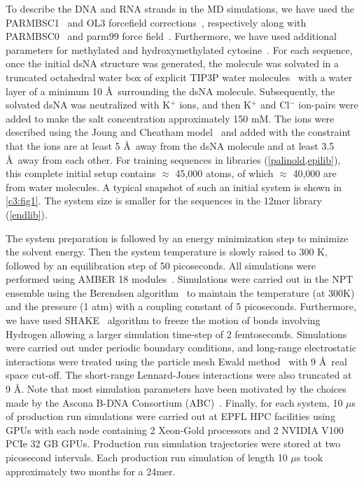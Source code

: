 To describe the DNA and RNA strands in the MD simulations, we have used the PARMBSC1~\cite{parmbsc1} and OL3 forcefield corrections~\cite{zgarbova2011refinement}, respectively along with PARMBSC0~\cite{perez2007refinement} and parm99 force field~\cite{cheatham1999modified}.
Furthermore, we have used additional parameters for methylated and hydroxymethylated cytosine~\cite{battistini2021impact,perez2012impact}.
For each sequence, once the initial dsNA structure was generated, the molecule was solvated in a truncated octahedral water box of explicit TIP3P water molecules~\cite{tip3p} with a water layer of a minimum 10 \AA \ surrounding the dsNA molecule. 
Subsequently, the solvated dsNA was neutralized with K$^+$ ions, and then K$^+$ and Cl$^-$ ion-pairs were added to make the salt concentration approximately 150 mM.
The ions were described using the Joung and Cheatham model~\cite{jcion} and added with the constraint that the ions are at least 5 \AA \ away from the dsNA molecule and at least 3.5 \AA \ away from each other.
For training sequences in libraries (\cref{palinold,epilib}), this complete initial setup contains $\approx$ 45,000 atoms, of which $\approx$ 40,000 are from water molecules.
A typical snapshot of such an initial system is shown in \cref{c3:fig1}. 
The system size is smaller for the sequences in the 12mer library (\cref{endlib}).

The system preparation is followed by an energy minimization step to minimize the solvent energy.
Then the system temperature is slowly raised to 300 K, followed by an equilibration step of 50 picoseconds.
All simulations were performed using AMBER 18 modules~\cite{amber}.
Simulations were carried out in the NPT ensemble using the Berendsen algorithm~\cite{npt} to maintain the temperature (at 300K) and the pressure (1 atm) with a coupling constant of 5 picoseconds.
Furthermore, we have used SHAKE~\cite{shake} algorithm to freeze the motion of bonds involving Hydrogen allowing a larger simulation time-step of 2 femtoseconds.
Simulations were carried out under periodic boundary conditions, and long-range electrostatic interactions were treated using the particle mesh Ewald method~\cite{pme} with 9 \AA \ real space cut-off.
The short-range Lennard-Jones interactions were also truncated at 9 \AA.
Note that most simulation parameters have been motivated by the choices made by the Ascona B-DNA Consortium (ABC)~\cite{lavery2010systematic}.
Finally, for each system, 10 $\mu$s of production run simulations were carried out at EPFL HPC facilities using GPUs with each node containing 2 Xeon-Gold processors and 2 NVIDIA V100 PCIe 32 GB GPUs.
Production run simulation trajectories were stored at two picosecond intervals.
Each production run simulation of length 10 $\mu$s took approximately two months for a 24mer.
